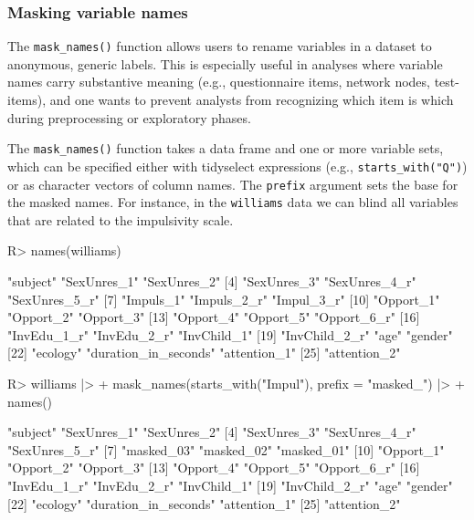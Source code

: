 \documentclass[
]{jss}
\begin{document}
\subsubsection{Masking variable names}\label{masking-variable-names}

The \texttt{mask\_names()} function allows users to rename variables in
a dataset to anonymous, generic labels. This is especially useful in
analyses where variable names carry substantive meaning (e.g.,
questionnaire items, network nodes, test-items), and one wants to
prevent analysts from recognizing which item is which during
preprocessing or exploratory phases.

The \texttt{mask\_names()} function takes a data frame and one or more
variable sets, which can be specified either with tidyselect expressions
(e.g., \texttt{starts\_with("Q")}) or as character vectors of column
names. The \texttt{prefix} argument sets the base for the masked names.
For instance, in the \texttt{williams} data we can blind all variables
that are related to the impulsivity scale.

\begin{CodeChunk}
\begin{CodeInput}
R> names(williams)
\end{CodeInput}
\begin{CodeOutput}
 [1] "subject"             "SexUnres_1"          "SexUnres_2"         
 [4] "SexUnres_3"          "SexUnres_4_r"        "SexUnres_5_r"       
 [7] "Impuls_1"            "Impuls_2_r"          "Impul_3_r"          
[10] "Opport_1"            "Opport_2"            "Opport_3"           
[13] "Opport_4"            "Opport_5"            "Opport_6_r"         
[16] "InvEdu_1_r"          "InvEdu_2_r"          "InvChild_1"         
[19] "InvChild_2_r"        "age"                 "gender"             
[22] "ecology"             "duration_in_seconds" "attention_1"        
[25] "attention_2"        
\end{CodeOutput}
\begin{CodeInput}
R> williams |> 
+     mask_names(starts_with("Impul"), prefix = "masked_") |> 
+     names()
\end{CodeInput}
\begin{CodeOutput}
 [1] "subject"             "SexUnres_1"          "SexUnres_2"         
 [4] "SexUnres_3"          "SexUnres_4_r"        "SexUnres_5_r"       
 [7] "masked_03"           "masked_02"           "masked_01"          
[10] "Opport_1"            "Opport_2"            "Opport_3"           
[13] "Opport_4"            "Opport_5"            "Opport_6_r"         
[16] "InvEdu_1_r"          "InvEdu_2_r"          "InvChild_1"         
[19] "InvChild_2_r"        "age"                 "gender"             
[22] "ecology"             "duration_in_seconds" "attention_1"        
[25] "attention_2"        
\end{CodeOutput}
\end{CodeChunk}
\end{document}
